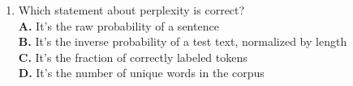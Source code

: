 \documentclass[11pt]{article}
\begin{document}
\begin{enumerate}[label=Q\arabic*., leftmargin=*]
\item Which statement about perplexity is correct?\\[0.25em]
\textbf{A.} It’s the raw probability of a sentence\\
\textbf{B.} It’s the inverse probability of a test text, normalized by length\\
\textbf{C.} It’s the fraction of correctly labeled tokens\\
\textbf{D.} It’s the number of unique words in the corpus

\end{enumerate}
\end{document}
